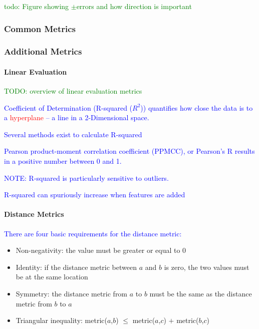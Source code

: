 \textcolor{green}{todo: Figure showing $\pm$errors and how direction is important}

\subsubsection{Common Metrics}

 



\subsubsection{Additional Metrics}


\paragraph{Linear Evaluation}

\textcolor{green}{TODO: overview of linear evaluation metrics}

\textcolor{blue}{Coefficient of Determination (R-squared ($R^2$)) quantifies how close the data is to a \textcolor{red}{hyperplane} -- a line in a 2-Dimensional space.}

\textcolor{blue}{Several methods exist to calculate R-squared}

\textcolor{blue}{Pearson product-moment correlation coefficient (PPMCC), or {Pearson's R} results in a positive number between 0 and 1.}

\textcolor{blue}{NOTE: R-squared is particularly sensitive to outliers.}

\textcolor{blue}{R-squared can spuriously increase when features are added}

\paragraph{Distance Metrics}

\textcolor{blue}{There are four basic requirements for the distance metric:}

\begin{itemize}
	\item Non-negativity: the value must be greater or equal to 0
	\item Identity: if the distance metric between $a$ and $b$ is zero, the two values must be at the same location
	\item Symmetry: the distance metric from $a$ to $b$ must be the same as the distance metric from $b$ to $a$
	\item Triangular inequality: metric($a$,$b$) $\le$ metric($a$,$c$) $+$ metric($b$,$c$)
\end{itemize}

